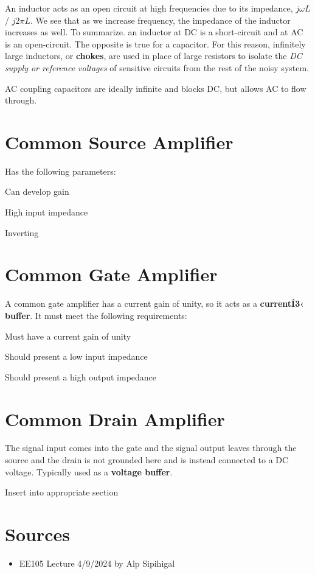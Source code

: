 An inductor acts as an open circuit at high frequencies due to its impedance, $j \omega L$ / $j 2 \pi L$. We see that as we increase frequency, the impedance of the inductor increases as well. To summarize. an inductor at DC is a short-circuit and at AC is an open-circuit. The opposite is true for a capacitor. For this reason, infinitely large inductors, or \textbf{chokes}, are used in place of large resistors to isolate the \textit{DC supply or reference voltages} of sensitive circuits from the rest of the noisy system. 

AC coupling capacitors are ideally infinite and blocks DC, but allows AC to flow through.

\section{Common Source Amplifier}
Has the following parameters:
\begin{pline}
    \item Can develop gain
    \item High input impedance
    \item Inverting
\end{pline}

\section{Common Gate Amplifier}
A common gate amplifier has a current gain of unity, so it acts as a \textbf{currentÍ3‹ buffer}. It must meet the following requirements:
\begin{pline}
    \item Must have a current gain of unity
    \item Should present a low input impedance
    \item Should present a high output impedance
\end{pline}

\section{Common Drain Amplifier}
The signal input comes into the gate and the signal output leaves through the source and the drain is not grounded here and is instead connected to a DC voltage. Typically used as a \textbf{voltage buffer}.

\begin{todo}
    \item Insert into appropriate section
\end{todo}



\section{Sources}
\begin{itemize}
    \item EE105 Lecture 4/9/2024 by Alp Sipihigal
\end{itemize}
